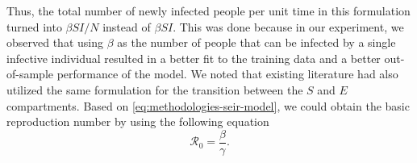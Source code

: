 Thus, the total number of newly infected people per unit time in this formulation turned into $\beta SI / N$ instead of $\beta SI$.
This was done because in our experiment, we observed that using $\beta$ as the number of people that can be infected by a single infective individual resulted in a better fit to the training data and a better out-of-sample performance of the model.
We noted that existing literature \cite{arikInterpretableSequenceLearning, bastosModelingForecastingEarly2020,dengDynamicsDevelopmentCOVID192020, heSEIRModelingCOVID192020,ihmecovid-19forecastingteamModelingCOVID19Scenarios2021, ndairouMathematicalModelingCOVID192020,sarkarModelingForecastingCOVID192020, zhaoModelingEpidemicDynamics2020} had also utilized the same formulation for the transition between the $S$ and $E$ compartments.
Based on \autoref{eq:methodologies-seir-model}, we could obtain the basic reproduction number by using the following equation
\begin{equation*}
    \mathcal{R}_0 = \frac{\beta}{\gamma}.
    \label{eq:methodologies-seir-reproduction-number}
\end{equation*}

